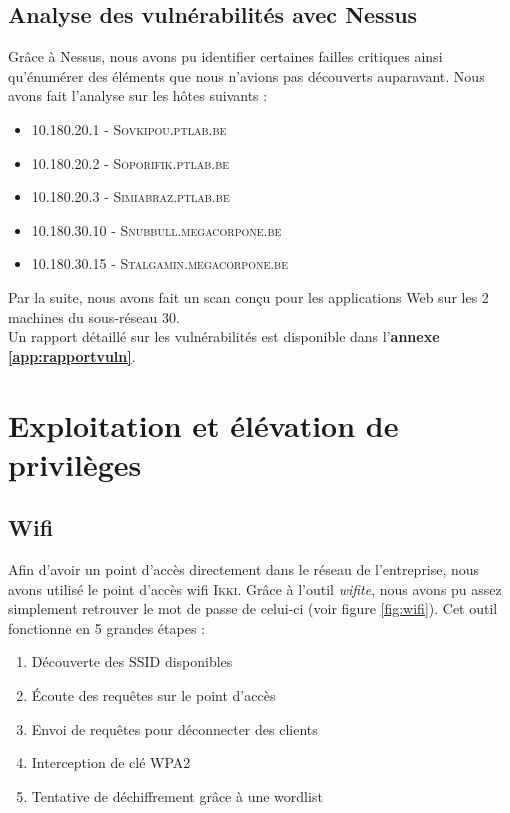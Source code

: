 \documentclass[a4paper]{article}
\begin{document}
\subsection{Analyse des vulnérabilités avec Nessus}
Grâce à Nessus, nous avons pu identifier certaines failles critiques ainsi qu'énumérer des éléments que nous n'avions pas découverts auparavant. Nous avons fait l'analyse sur les hôtes suivants :
\begin{itemize}
    \item 10.180.20.1 - \textsc{Sovkipou.ptlab.be}
    \item 10.180.20.2 - \textsc{Soporifik.ptlab.be}
    \item 10.180.20.3 - \textsc{Simiabraz.ptlab.be}
    \item 10.180.30.10 - \textsc{Snubbull.megacorpone.be}
    \item 10.180.30.15 - \textsc{Stalgamin.megacorpone.be}
\end{itemize}
Par la suite, nous avons fait un scan conçu pour les applications Web sur les 2 machines du sous-réseau 30.\\
Un rapport détaillé sur les vulnérabilités est disponible dans l'\textbf{annexe \ref{app:rapportvuln}}.




\newpage
\section{Exploitation et élévation de privilèges} \label{sec:exploitation}
\subsection{Wifi}\label{sec:wifi}

Afin d'avoir un point d'accès directement dans le réseau de l'entreprise, nous avons utilisé le point d'accès wifi \textsc{Ikki}. Grâce à l'outil \emph{wifite}, nous avons pu assez simplement retrouver le mot de passe de celui-ci (voir figure \ref{fig:wifi}). Cet outil fonctionne en 5 grandes étapes : 
\begin{enumerate}
    \item Découverte des SSID disponibles
    \item Écoute des requêtes sur le point d'accès
    \item Envoi de requêtes pour déconnecter des clients
    \item Interception de clé WPA2
    \item Tentative de déchiffrement grâce à une wordlist
\end{enumerate}
\end{document}
